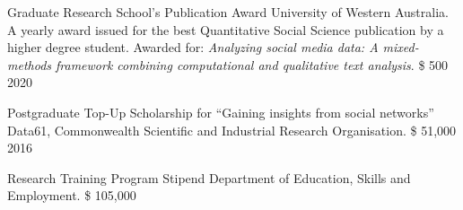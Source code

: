 

\begin{cvhonors}

  \cvhonor
    {Graduate Research School's Publication Award} %
    {University of Western Australia.\linebreak
    A yearly award issued for the best Quantitative Social Science publication by a higher degree student.
    Awarded for: \textit{Analyzing social media data: A mixed-methods framework combining computational and qualitative text analysis}.} %
    {\$ 500} %
    {2020} %
    
\end{cvhonors}

\begin{cvhonors}
  \cvhonor
    {Postgraduate Top-Up Scholarship for ``Gaining insights from social networks''} %
    {Data61, Commonwealth Scientific and Industrial Research Organisation.} %
    {\$ 51,000} %
    {2016} %

  \cvhonor
    {Research Training Program Stipend} %
    {Department of Education, Skills and Employment.} %
    {\$ 105,000} %
    {} %

\end{cvhonors}

